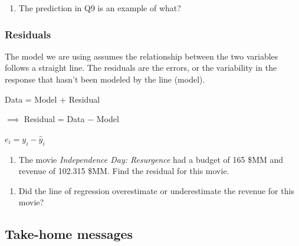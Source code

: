 \documentclass[
]{report}
\providecommand{\tightlist}{%
  \setlength{\itemsep}{0pt}\setlength{\parskip}{0pt}}
\begin{document}
\begin{enumerate}
\def\labelenumi{\arabic{enumi}.}
\setcounter{enumi}{9}
\tightlist
\item
  The prediction in Q9 is an example of what?
\end{enumerate}

\vspace{0.3in}

\hypertarget{residuals}{%
\subsubsection*{Residuals}\label{residuals}}

The model we are using assumes the relationship between the two variables follows a straight line. The residuals are the errors, or the variability in the response that hasn't been modeled by the line (model).

\begin{center}
Data = Model + Residual

$\implies$ Residual = Data $-$ Model

$e_i=y_i-\hat{y}_i$
\end{center}

\begin{enumerate}
\def\labelenumi{\arabic{enumi}.}
\setcounter{enumi}{10}
\tightlist
\item
  The movie \emph{Independence Day: Resurgence} had a budget of 165 \$MM and revenue of 102.315 \$MM. Find the residual for this movie.
\end{enumerate}

\vspace{.8in}

\begin{enumerate}
\def\labelenumi{\arabic{enumi}.}
\setcounter{enumi}{11}
\tightlist
\item
  Did the line of regression overestimate or underestimate the revenue for this movie?
\end{enumerate}

\vspace{.2in}

\hypertarget{take-home-messages-7}{%
\subsection{Take-home messages}\label{take-home-messages-7}}
\end{document}
